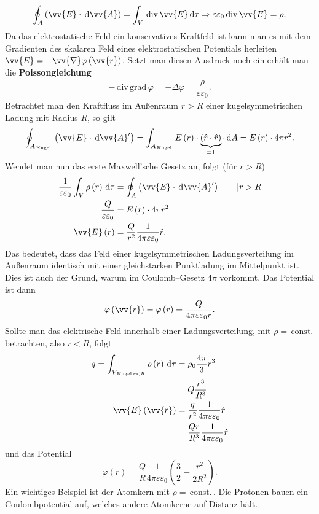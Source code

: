 \documentclass[a4paper,12pt]{article}
\newcommand{\td}{\,\text{d}}
\begin{document}
\begin{align*}
        \oint_{A}^{}\left(\vv{E}\cdot \td\vv{A}\right)=\int_{V}^{}\,\text{div}\,\vv{E}\td \tau \Rightarrow  \varepsilon \varepsilon _0\,\text{div}\,\vv{E}=\rho 
.\end{align*}
Da das elektrostatische Feld ein konservatives Kraftfeld ist kann man es mit dem Gradienten des skalaren Feld eines elektrostatischen Potentials herleiten $\vv{E}=-\vv{\nabla }\varphi \left(\vv{r}\right)$. Setzt man diesen Ausdruck noch ein erhält man die \textbf{Poissongleichung}
\begin{align*}
        -\,\text{div}\,\text{grad}\,\varphi =-\Delta \varphi =\dfrac{\rho }{\varepsilon \varepsilon _0}
.\end{align*}
Betrachtet man den Kraftfluss im Außenraum $r>R$ einer kugelsymmetrischen Ladung mit Radius $R$, so gilt
\[ 
        \oint_{A_{\,\text{Kugel}\,}}^{}\left(\vv{E}\cdot \td \vv{A}'\right)=\int_{A_{\,\text{Kugel}\,}}^{}E\left(r\right)\cdot \underbrace{\left(\hat{r}\cdot \hat{r}\right)}_{=1}\cdot \td A=E\left(r\right)\cdot 4\pi r^2
.\] 
Wendet man nun das erste Maxwell'sche Gesetz an, folgt (für $r>R$)
\begin{align*}
        \dfrac{1}{\varepsilon \varepsilon _0}\int_{V}^{}\rho \left(r\right)\td \tau &=\oint_{A}^{}\left(\vv{E}\cdot \td \vv{A}'\right)\qquad |r>R\\
        \dfrac{Q}{\varepsilon \varepsilon _0}&=E\left(r\right)\cdot 4\pi r^2\\
        \vv{E}\left(r\right)&=\dfrac{Q}{r^2}\dfrac{1}{4\pi \varepsilon \varepsilon _0}\hat{r}
.\end{align*}
Das bedeutet, dass das Feld einer kugelsymmetrischen Ladungsverteilung im Außenraum identisch mit einer gleichstarken Punktladung im Mittelpunkt ist. Dies ist auch der Grund, warum im Coulomb--Gesetz $4\pi $ vorkommt. Das Potential ist dann
\[ 
        \varphi \left(\vv{r}\right)=\varphi \left(r\right)=\dfrac{Q}{4\pi \varepsilon \varepsilon _0r}
.\] 
Sollte man das elektrische Feld innerhalb einer Ladungsverteilung, mit $\rho =\,\text{const.}\,$ betrachten, also $r<R$, folgt
\begin{align*}
        q=\int_{V_{\,\text{Kugel}\,r<R}}^{}\rho \left(r\right)\td \tau &=\rho _0\dfrac{4\pi }{3}r^3\\
                                                                       &=Q\dfrac{r^3}{R^3}\\
        \vv{E}\left(\vv{r}\right)&=\dfrac{q}{r^2}\dfrac{1}{4\pi \varepsilon \varepsilon _0}\hat{r}\\
                                 &=\dfrac{Qr}{R^3}\dfrac{1}{4\pi \varepsilon \varepsilon _0}\hat{r}
\end{align*}
und das Potential
\[ 
        \varphi \left(r\right)=\dfrac{Q}{R}\dfrac{1}{4\pi \varepsilon \varepsilon _0}\left(\dfrac{3}{2}-\dfrac{r^2}{2R^2}\right)
.\] 
Ein wichtiges Beispiel ist der Atomkern mit $\rho =\,\text{const.}\,$. Die Protonen bauen ein Coulombpotential auf, welches andere Atomkerne auf Distanz hält.
\end{document}
